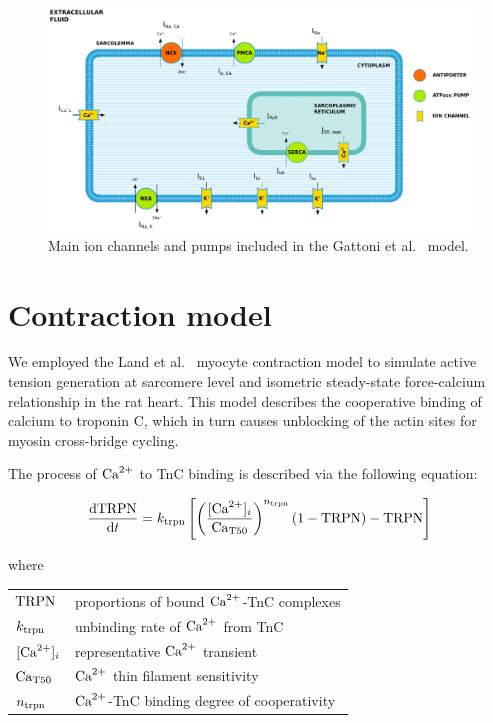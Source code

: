 \begin{figure}[!ht]
    \myfloatalign
    \includegraphics[width=\textwidth]{figures/chapter02/ep.pdf}
    \caption{Main ion channels and pumps included in the Gattoni et al.~\cite{Gattoni:2016} model. }
    \label{fig:gattonicurrentsfig}
\end{figure}




%
%
%
\section{Contraction model}\label{sec:contractionmodel}
We employed the Land et al.~\cite{Land:2012} myocyte contraction model to simulate active tension generation at sarcomere level and isometric steady-state force-calcium relationship in the rat heart. This model describes the cooperative binding of calcium to troponin C, which in turn causes unblocking of the actin sites for myosin cross-bridge cycling.

\vspace{0.2cm}
The process of $\textrm{Ca}^{2+}$ to TnC binding is described via the following equation:

\begin{equation}\label{eq:landodesys1}
    \dfrac{\mathrm{d}{\textrm{TRPN}}}{\mathrm{d}{t}} = k_{\textrm{trpn}}\left[\left(\frac{[\textrm{Ca}^{2+}]_{i}}{\textrm{Ca}_{\textrm{T}50}}\right)^{n_{\textrm{trpn}}}(1-\textrm{TRPN})-\textrm{TRPN}\right]
\end{equation}

\noindent
where

\vspace{0.2cm}
\begin{tabular}{ll}
    $\textrm{TRPN}$  & proportions of bound $\textrm{Ca}^{2+}$-TnC complexes \\
    $k_{\textrm{trpn}}$ & unbinding rate of $\textrm{Ca}^{2+}$ from TnC \\
    $[\textrm{Ca}^{2+}]_{i}$   & representative $\textrm{Ca}^{2+}$ transient \\
    $\textrm{Ca}_{\textrm{T}50}$ & $\textrm{Ca}^{2+}$ thin filament sensitivity \\
    $n_{\textrm{trpn}}$ & $\textrm{Ca}^{2+}$-TnC binding degree of cooperativity
\end{tabular}

